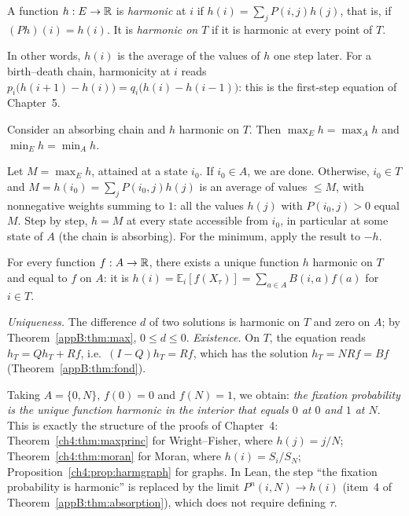\begin{definition}
A function $h:E\to\mathbb{R}$ is \emph{harmonic} at $i$ if $h(i)=\sum_jP(i,j)h(j)$, that is, if $(Ph)(i)=h(i)$. It
is \emph{harmonic on $T$} if it is harmonic at every point of $T$.
\end{definition}
In other words, $h(i)$ is the average of the values of $h$ one step later. For a birth--death chain,
harmonicity at $i$ reads $p_i\bigl(h(i+1)-h(i)\bigr)=q_i\bigl(h(i)-h(i-1)\bigr)$: this is the first-step equation of
Chapter~5.

\begin{theorem}\label{appB:thm:max}
Consider an absorbing chain and $h$ harmonic on $T$. Then $\max_Eh=\max_Ah$ and $\min_Eh=\min_Ah$.
\end{theorem}

\begin{humanproof}
Let $M=\max_Eh$, attained at a state $i_0$. If $i_0\in A$, we are done. Otherwise, $i_0\in T$ and
$M=h(i_0)=\sum_jP(i_0,j)h(j)$ is an average of values $\le M$, with nonnegative weights summing to $1$: all the values
$h(j)$ with $P(i_0,j)>0$ equal $M$. Step by step, $h=M$ at every state accessible from $i_0$, in particular
at some state of $A$ (the chain is absorbing). For the minimum, apply the result to $-h$.
\end{humanproof}

\begin{corollary}\label{appB:cor:dirichlet}
For every function $f:A\to\mathbb{R}$, there exists a unique function $h$ harmonic on $T$ and equal to $f$ on $A$: it is
$h(i)=\mathbb E_i[f(X_\tau)]=\sum_{a\in A}B(i,a)f(a)$ for $i\in T$.
\end{corollary}

\begin{humanproof}
\emph{Uniqueness.} The difference $d$ of two solutions is harmonic on $T$ and zero on $A$; by
Theorem~\ref{appB:thm:max}, $0\le d\le0$.
\emph{Existence.} On $T$, the equation reads $h_T=Qh_T+Rf$, i.e.\ $(I-Q)h_T=Rf$, which has the solution $h_T=NRf=Bf$
(Theorem~\ref{appB:thm:fond}).
\end{humanproof}

Taking $A=\{0,N\}$, $f(0)=0$ and $f(N)=1$, we obtain: \emph{the fixation probability is the unique function
harmonic in the interior that equals $0$ at $0$ and $1$ at $N$}. This is exactly the structure of the proofs of
Chapter~4: Theorem~\ref{ch4:thm:maxprinc} for Wright--Fisher, where $h(j)=j/N$; Theorem~\ref{ch4:thm:moran} for Moran,
where $h(i)=S_i/S_N$; Proposition~\ref{ch4:prop:harmgraph} for graphs. In Lean, the step ``the fixation probability
is harmonic'' is replaced by the limit $P^n(i,N)\to h(i)$ (item~4 of Theorem~\ref{appB:thm:absorption}),
which does not require defining $\tau$.

